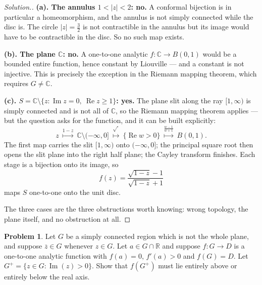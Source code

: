 \documentclass[11pt,a4paper]{article}
\theoremstyle{definition}
\newtheorem{problemx}{Problem}[section]
\newenvironment{problem}{\begin{problemx}}{\end{problemx}}
\newenvironment{solution}
  {\renewcommand{\qedsymbol}{}\begin{proof}[\textit{Solution}.]}
  {\end{proof}}
\begin{document}
\begin{solution}
\textbf{(a). The annulus $1 < \left|z\right| < 2$: no.} A conformal bijection is in
particular a homeomorphism, and the annulus is not simply connected while the disc
is. The circle $\left|z\right| = \tfrac32$ is not contractible in the annulus but
its image would have to be contractible in the disc. So no such map exists.

\textbf{(b). The plane $\mathbb{C}$: no.} A one-to-one analytic
$f : \mathbb{C} \rightarrow B(0,1)$ would be a bounded entire function, hence
constant by Liouville --- and a constant is not injective. This is precisely the
exception in the Riemann mapping theorem, which requires $G \neq \mathbb{C}$.

\textbf{(c). $S = \mathbb{C}\setminus\{z : \operatorname{Im}z = 0,\ \operatorname{Re}z \geq 1\}$: yes.}
The plane slit along the ray $[1,\infty)$ is simply connected and is not all of
$\mathbb{C}$, so the Riemann mapping theorem applies --- but the question asks for
the function, and it can be built explicitly:
$$z \ \overset{1-z}{\longmapsto}\ \mathbb{C}\setminus(-\infty,0]
\ \overset{\sqrt{\ }}{\longmapsto}\ \{\operatorname{Re}w > 0\}
\ \overset{\frac{w-1}{w+1}}{\longmapsto}\ B(0,1).$$
The first map carries the slit $[1,\infty)$ onto $(-\infty,0]$; the principal
square root then opens the slit plane into the right half plane; the Cayley
transform finishes. Each stage is a bijection onto its image, so
$$\boxed{f(z) = \frac{\sqrt{1-z}-1}{\sqrt{1-z}+1}}$$
maps $S$ one-to-one onto the unit disc.

The three cases are the three obstructions worth knowing: wrong topology, the plane
itself, and no obstruction at all.
\end{solution}


\begin{problem}
Let $G$ be a simply connected region which is not the whole plane, and suppose
$\overline{z} \in G$ whenever $z \in G$. Let $a \in G \cap \mathbb{R}$ and
suppose $f : G \rightarrow D$ is a one-to-one analytic function with $f(a) = 0$,
$f'(a) > 0$ and $f(G) = D$. Let $G^{+} = \{z \in G : \operatorname{Im}(z) > 0\}$.
Show that $f(G^{+})$ must lie entirely above or entirely below the real axis.
\end{problem}
\end{document}
